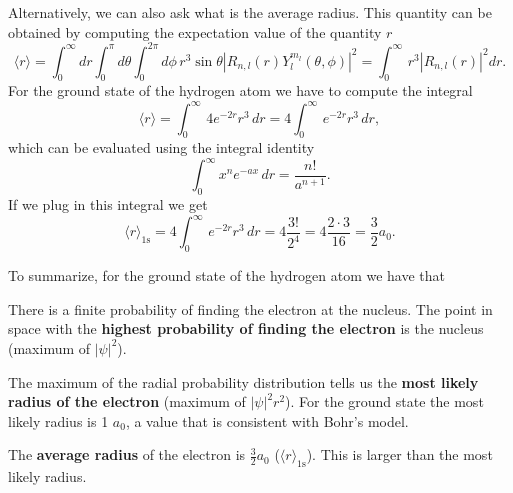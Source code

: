 \documentclass[../Main/chem331-notes.tex]{subfiles}
\begin{document}
Alternatively, we can also ask what is the average radius. This quantity can be obtained by computing the expectation value of the quantity $r$
\begin{equation}
\langle r \rangle = \int_{0}^{\infty} dr
\int_{0}^{\pi} d\theta
\int_{0}^{2\pi} d\phi \,r^3 \sin \theta |R_{n,l}(r) Y_l^{m_l}(\theta,\phi)|^2
= \int_{0}^{\infty} \,r^3 |R_{n,l}(r)|^2 dr.
\end{equation}
For the ground state of the hydrogen atom we have to compute the integral
\begin{equation}
\langle r \rangle = \int_{0}^{\infty} \, 4 e^{-2r} r^3 \, dr = 4 \int_{0}^{\infty} \, e^{-2r} r^3 \, dr,
\end{equation}
which can be evaluated using the integral identity
\begin{equation}
\int_{0}^{\infty} x^n e^{-ax}  \, dr = \frac{n!}{a^{n+1}}.
\end{equation}
If we plug in this integral we get
\begin{equation}
\langle r \rangle_{1\mathrm{s}} = 4 \int_{0}^{\infty} \, e^{-2r} r^3 \, dr = 4 \frac{3!}{2^4} = 4 \frac{2 \cdot 3}{16} = \frac{3}{2} a_0.
\end{equation}

To summarize, for the ground state of the hydrogen atom we have that
\begin{ibox}
\begin{myitems}
\item There is a finite probability of finding the electron at the nucleus. The point in space with the \textbf{highest probability of finding the electron} is the nucleus (maximum of $|\psi|^2$).
\item The maximum of the radial probability distribution tells us the \textbf{most likely radius of the electron}  (maximum of $|\psi|^2 r^2$). For the ground state the most likely radius is 1 $a_0$, a value that is consistent with Bohr's model.
\item The \textbf{average radius} of the electron is $\frac{3}{2} a_0$ ($\langle r \rangle_{1\mathrm{s}}$). This is larger than the most likely radius.
\end{myitems}
\end{ibox}

\end{document}
